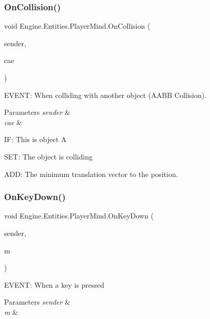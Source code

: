 \subsubsection{\texorpdfstring{On\+Collision()}{OnCollision()}}
{\footnotesize\ttfamily void Engine.\+Entities.\+Player\+Mind.\+On\+Collision (\begin{DoxyParamCaption}\item[{object}]{sender,  }\item[{\hyperlink{a00350}{Collision\+Event\+Args}}]{cae }\end{DoxyParamCaption})\hspace{0.3cm}{\ttfamily [inline]}}



E\+V\+E\+NT\+: When colliding with another object (A\+A\+BB Collision). 


\begin{DoxyParams}{Parameters}
{\em sender} & \\
\hline
{\em cae} & \\
\hline
\end{DoxyParams}
IF\+: This is object A

S\+ET\+: The object is colliding

A\+DD\+: The minimum translation vector to the position. \mbox{\label{a00326_a2c9b5d3a4834dc7446584a802460837f}} 
\subsubsection{\texorpdfstring{On\+Key\+Down()}{OnKeyDown()}}
{\footnotesize\ttfamily void Engine.\+Entities.\+Player\+Mind.\+On\+Key\+Down (\begin{DoxyParamCaption}\item[{object}]{sender,  }\item[{\hyperlink{a00362}{Key\+Event\+Args}}]{m }\end{DoxyParamCaption})\hspace{0.3cm}{\ttfamily [inline]}}



E\+V\+E\+NT\+: When a key is pressed 


\begin{DoxyParams}{Parameters}
{\em sender} & \\
\hline
{\em m} & \\
\hline
\end{DoxyParams}
\mbox{\label{a00326_ab3295433000f4defc2a420d9758c218e}} 
